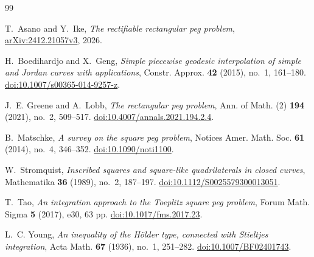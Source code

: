 \documentclass[11pt,reqno]{amsart}
\theoremstyle{definition}
\theoremstyle{remark}
\begin{document}


\begin{thebibliography}{99}

T.~Asano and Y.~Ike,
\emph{The rectifiable rectangular peg problem},
\href{https://arxiv.org/abs/2412.21057}{arXiv:2412.21057v3}, 2026.

H.~Boedihardjo and X.~Geng,
\emph{Simple piecewise geodesic interpolation of simple and Jordan curves
with applications},
Constr. Approx. \textbf{42} (2015), no.~1, 161--180.
\href{https://doi.org/10.1007/s00365-014-9257-z}
{doi:10.1007/s00365-014-9257-z}.

J.~E. Greene and A.~Lobb,
\emph{The rectangular peg problem},
Ann. of Math. (2) \textbf{194} (2021), no.~2, 509--517.
\href{https://doi.org/10.4007/annals.2021.194.2.4}
{doi:10.4007/annals.2021.194.2.4}.

B.~Matschke,
\emph{A survey on the square peg problem},
Notices Amer. Math. Soc. \textbf{61} (2014), no.~4, 346--352.
\href{https://doi.org/10.1090/noti1100}{doi:10.1090/noti1100}.

W.~Stromquist,
\emph{Inscribed squares and square-like quadrilaterals in closed curves},
Mathematika \textbf{36} (1989), no.~2, 187--197.
\href{https://doi.org/10.1112/S0025579300013051}
{doi:10.1112/S0025579300013051}.

T.~Tao,
\emph{An integration approach to the Toeplitz square peg problem},
Forum Math. Sigma \textbf{5} (2017), e30, 63 pp.
\href{https://doi.org/10.1017/fms.2017.23}{doi:10.1017/fms.2017.23}.

L.~C. Young,
\emph{An inequality of the H\"older type, connected with Stieltjes
integration},
Acta Math. \textbf{67} (1936), no.~1, 251--282.
\href{https://doi.org/10.1007/BF02401743}{doi:10.1007/BF02401743}.

\end{thebibliography}
\end{document}
